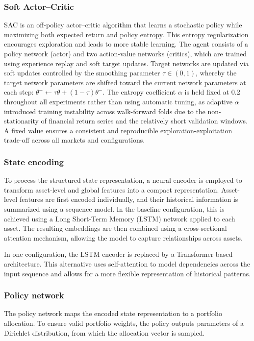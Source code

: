 \documentclass[]{elsarticle}
\begin{document}
\subsubsection{Soft Actor--Critic}
SAC is an off-policy actor--critic algorithm that learns a stochastic policy while maximizing both expected return and policy entropy. This entropy regularization encourages exploration and leads to more stable learning. The agent consists of a policy network (actor) and two action-value networks (critics), which are trained using experience replay and soft target updates. Target networks are updated via soft updates controlled by the smoothing parameter $\tau \in (0,1)$, whereby the target network parameters are shifted toward the current network parameters at each step: $\theta^{-} \leftarrow \tau\theta + (1-\tau)\theta^{-}$. The entropy coefficient $\alpha$ is held fixed at 0.2 throughout all experiments rather than using automatic tuning, as adaptive $\alpha$ introduced training instability across walk-forward folds due to the non-stationarity of financial return series and the relatively short validation windows. A fixed value ensures a consistent and reproducible exploration-exploitation trade-off across all markets and configurations.

\subsubsection{State encoding}
To process the structured state representation, a neural encoder is employed to transform asset-level and global features into a compact representation. Asset-level features are first encoded individually, and their historical information is summarized using a sequence model. In the baseline configuration, this is achieved using a Long Short-Term Memory (LSTM) network applied to each asset. The resulting embeddings are then combined using a cross-sectional attention mechanism, allowing the model to capture relationships across assets.

In one configuration, the LSTM encoder is replaced by a Transformer-based architecture. This alternative uses self-attention to model dependencies across the input sequence and allows for a more flexible representation of historical patterns.

\subsubsection{Policy network}
The policy network maps the encoded state representation to a portfolio allocation. To ensure valid portfolio weights, the policy outputs parameters of a Dirichlet distribution, from which the allocation vector is sampled.
\end{document}
